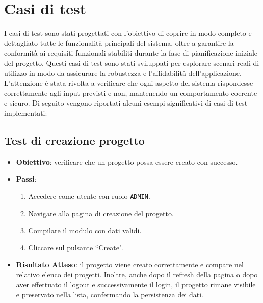 \documentclass[target=bach,aauheader=,style=]{thud}
\begin{document}
\section{Casi di test}
I casi di test sono stati progettati con l'obiettivo di coprire in modo completo e dettagliato tutte le funzionalità principali del sistema, oltre a garantire la conformità ai requisiti funzionali stabiliti durante la fase di pianificazione iniziale del progetto. Questi casi di test sono stati sviluppati per esplorare scenari reali di utilizzo in modo da assicurare la robustezza e l'affidabilità dell'applicazione. L'attenzione è stata rivolta a verificare che ogni aspetto del sistema rispondesse correttamente agli input previsti e non, mantenendo un comportamento coerente e sicuro.  Di seguito vengono riportati alcuni esempi significativi di casi di test implementati:

\subsection{Test di creazione progetto}
\begin{itemize}
    \item \textbf{Obiettivo}: verificare che un progetto possa essere creato con successo.
    \item \textbf{Passi}:
    \begin{enumerate}
        \item Accedere come utente con ruolo \texttt{ADMIN}.
        \item Navigare alla pagina di creazione del progetto.
        \item Compilare il modulo con dati validi.
        \item Cliccare sul pulsante ``Create".
    \end{enumerate}
    \item \textbf{Risultato Atteso}: il progetto viene creato correttamente e compare nel relativo elenco dei progetti. Inoltre, anche dopo il refresh della pagina o dopo aver effettuato il logout e successivamente il login, il progetto rimane visibile e preservato nella lista, confermando la persistenza dei dati.
\end{itemize}
\end{document}
